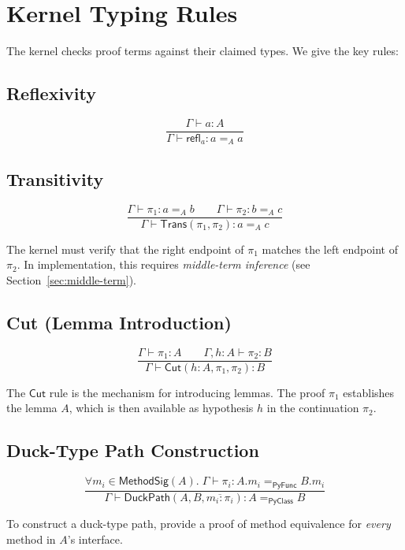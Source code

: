 \documentclass[11pt,a4paper]{report}
\theoremstyle{definition}
\theoremstyle{plain}
\newcommand{\PyClass}{\mathsf{PyClass}}
\newcommand{\PyFunc}{\mathsf{PyFunc}}
\newcommand{\Refl}{\mathsf{refl}}
\newcommand{\Cut}{\mathsf{Cut}}
\newcommand{\Trans}{\mathsf{Trans}}
\newcommand{\MethodSig}{\mathsf{MethodSig}}
\begin{document}
\section{Kernel Typing Rules}

The kernel checks proof terms against their claimed types. We give the key rules:

\subsection{Reflexivity}

\[
  \frac{\Gamma \vdash a : A}{\Gamma \vdash \Refl_a : a =_A a}
\]

\subsection{Transitivity}

\[
  \frac{
    \Gamma \vdash \pi_1 : a =_A b \qquad
    \Gamma \vdash \pi_2 : b =_A c
  }{
    \Gamma \vdash \Trans(\pi_1, \pi_2) : a =_A c
  }
\]

The kernel must verify that the right endpoint of $\pi_1$ matches the left
endpoint of $\pi_2$. In implementation, this requires \emph{middle-term inference}
(see Section~\ref{sec:middle-term}).

\subsection{Cut (Lemma Introduction)}

\[
  \frac{
    \Gamma \vdash \pi_1 : A \qquad
    \Gamma, h : A \vdash \pi_2 : B
  }{
    \Gamma \vdash \Cut(h : A, \pi_1, \pi_2) : B
  }
\]

The $\Cut$ rule is the mechanism for introducing lemmas. The proof $\pi_1$
establishes the lemma $A$, which is then available as hypothesis $h$ in the
continuation $\pi_2$.

\subsection{Duck-Type Path Construction}

\[
  \frac{
    \forall m_i \in \MethodSig(A).\;
    \Gamma \vdash \pi_i : A.m_i =_{\PyFunc} B.m_i
  }{
    \Gamma \vdash \mathsf{DuckPath}(A, B, \overline{m_i : \pi_i}) : A =_{\PyClass} B
  }
\]

To construct a duck-type path, provide a proof of method equivalence for
\emph{every} method in $A$'s interface.
\end{document}
